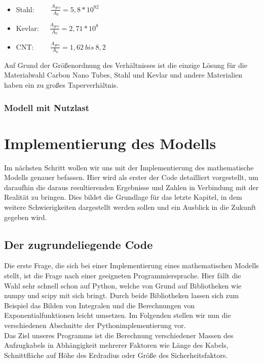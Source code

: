 \documentclass[a4paper, 10pt]{report}
\begin{document}
\begin{itemize}
\item Stahl: \ \ \ \ $\frac{A_{geo}}{A_0} = 5,8 *10^82$
\item Kevlar:\ \ \   $\frac{A_{geo}}{A_0} = 2,71 *10^8$
\item CNT: \ \ \ \ $\frac{A_{geo}}{A_0} = 1,62\ bis\ 8,2 $ 
\end{itemize}

Auf Grund der Größenordnung des Verhältnisses ist die einzige Lösung für die Materialwahl Carbon Nano Tubes, Stahl und Kevlar und andere Materialien haben ein zu großes Taperverhältnis.

\subsection{Modell mit Nutzlast}



\chapter{Implementierung des Modells}
Im nächsten Schritt wollen wir uns mit der Implementierung des mathematische Modells genauer befassen. Hier wird als erster der Code detailliert vorgestellt, um daraufhin die daraus resultierenden Ergebnisse und Zahlen in Verbindung mit der Realität zu bringen. Dies bildet die Grundlage für das letzte Kapitel, in dem weitere Schwierigkeiten dargestellt werden sollen und ein Ausblick in die Zukunft gegeben wird.
\section{Der zugrundeliegende Code}
Die erste Frage, die sich bei einer Implementierung eines mathematischen Modells stellt, ist die Frage nach einer geeigneten Programmiersprache. Hier fällt die Wahl sehr schnell schon auf Python, welche von Grund auf Bibliotheken wie numpy und scipy mit sich bringt. Durch beide Bibliotheken lassen sich zum Beispiel das Bilden von Integralen und die Berechnungen von Exponentialfunktionen leicht umsetzen. 
Im Folgenden stellen wir nun die verschiedenen Abschnitte der Pythonimplementierung vor.\\
Das Ziel unseres Programms ist die Berechnung verschiedener Massen des Aufzugkabels in Abhängigkeit mehrerer Faktoren wie Länge des Kabels, Schnittfläche auf Höhe des Erdradius oder Größe des Sicherheitsfaktors.
 
\end{document}
